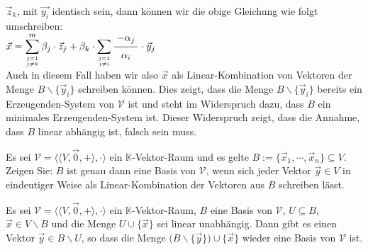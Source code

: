 $\vec{z}_k$, mit $\vec{y_i}$ identisch sein, dann k\"{o}nnen wir die obige Gleichung wie folgt
umschreiben:
\\[0.2cm]
\hspace*{1.3cm}
$\ds\vec{x} = \sum\limits_{j=1 \atop j \not=k}^m \beta_j \cdot \vec{z}_j + 
              \beta_k \cdot \sum\limits_{j=1 \atop j \not= i} \bruch{-\alpha_j}{\alpha_i} \cdot \vec{y}_j
$
\\[0.2cm]
Auch in diesem Fall haben wir also $\vec{x}$ als Linear-Kombination von Vektoren der Menge 
$B \backslash \{ \vec{y}_i \}$ schreiben k\"{o}nnen.  Dies zeigt, dass die Menge
$B \backslash \{ \vec{y}_i \}$ bereits ein Erzeugenden-System von $\mathcal{V}$ ist und steht im
Widerspruch dazu, dass $B$ ein minimales Erzeugenden-System ist.  Dieser Widerspruch zeigt, dass die
Annahme, dass $B$ linear abh\"{a}ngig ist, falsch sein muss. \qeds

\exercise
Es sei $\mathcal{V} = \bigl\langle \langle V, \vec{0}, + \rangle, \cdot \bigr\rangle$ ein $\mathbb{K}$-Vektor-Raum und es gelte $B := \{ \vec{x}_1, \cdots, \vec{x}_n \} \subseteq V$.
Zeigen Sie:  $B$ ist genau dann eine Basis von $\mathcal{V}$, wenn sich jeder Vektor $\vec{y} \in V$ in
eindeutiger Weise als Linear-Kombination der Vektoren aus $B$ schreiben l\"{a}sst.
\eox

\begin{Lemma}
  Es sei $\mathcal{V} = \bigl\langle \langle V, \vec{0}, + \rangle, \cdot \bigr\rangle$
  ein $\mathbb{K}$-Vektor-Raum, $B$ eine Basis von $\mathcal{V}$, $U \subseteq B$, $\vec{x} \in V\backslash B$ und die
  Menge $U \cup \{ \vec{x} \}$ sei linear unabh\"{a}ngig.
  Dann gibt es einen Vektor $\vec{y} \in B \backslash U$, so dass die Menge
 $\bigl(B \backslash \{ \vec{y} \}\bigr) \cup \{ \vec{x} \}$ wieder eine Basis von $\mathcal{V}$ ist.
\end{Lemma}

